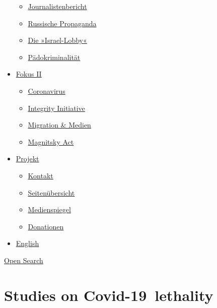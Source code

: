 \begin{itemize}
  \begin{itemize}
  \tightlist
  \item
    \href{https://swprs.org/bericht-eines-journalisten/}{Journalistenbericht}
  \item
    \href{https://swprs.org/russische-propaganda/}{Russische Propaganda}
  \item
    \href{https://swprs.org/die-israel-lobby-fakten-und-mythen/}{Die
    »Israel-Lobby«}
  \item
    \href{https://swprs.org/geopolitik-und-paedokriminalitaet/}{Pädokriminalität}
  \end{itemize}
\item
  \href{https://swprs.org/migration-und-medien/}{Fokus II}

  \begin{itemize}
  \tightlist
  \item
    \href{https://swprs.org/covid-19-hinweis-ii/}{Coronavirus}
  \item
    \href{https://swprs.org/die-integrity-initiative/}{Integrity
    Initiative}
  \item
    \href{https://swprs.org/migration-und-medien/}{Migration \& Medien}
  \item
    \href{https://swprs.org/der-fall-magnitsky/}{Magnitsky Act}
  \end{itemize}
\item
  \href{https://swprs.org/kontakt/}{Projekt}

  \begin{itemize}
  \tightlist
  \item
    \href{https://swprs.org/kontakt/}{Kontakt}
  \item
    \href{https://swprs.org/uebersicht/}{Seitenübersicht}
  \item
    \href{https://swprs.org/medienspiegel/}{Medienspiegel}
  \item
    \href{https://swprs.org/donationen/}{Donationen}
  \end{itemize}
\item
  \href{https://swprs.org/contact/}{English}
\end{itemize}

\protect\hyperlink{}{Open Search}

\hypertarget{studies-on-covid-19-lethality}{%
\section{Studies on
Covid-19~lethality}\label{studies-on-covid-19-lethality}}

